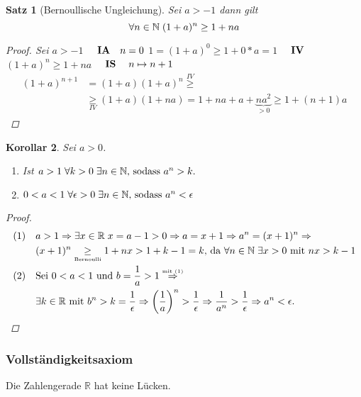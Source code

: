 \documentclass[a4paper,titlepage,oneside]{article}
\def\N{\ensuremath{\mathbb{N}} }
\def\R{\ensuremath{\mathbb{R}} }
\newcommand{\fa}{\ensuremath{\forall}}
\def\sp{\hspace{0,1cm}}
\newcommand{\IA}[1]{\newline\vspace{0.1cm}\ensuremath{\text{\quad\textbf{IA}\quad}#1}\quad}
\newcommand{\IV}{\newline\vspace{0.1cm}\ensuremath{\text{\quad\textbf{IV}\quad}}}
\newcommand{\IS}[1]{\newline\vspace{0.1cm}\ensuremath{\text{\quad\textbf{IS}\quad\sp}#1}}
\theoremstyle{thmstyle}
\newtheorem{satz}{Satz}[subsection]
\newtheorem{korr}[satz]{Korollar}
\begin{document}
\begin{satz}[Bernoullische Ungleichung]
Sei \(a > -1\) dann gilt \[\fa n \in \N \sp (1+a)^n \ge 1 + na \]
\begin{proof}Sei \(a > -1\)
\IA{n=0} \(1 = (1 + a)^0 \ge 1 + 0*a = 1\)
\IV \((1+a)^n \ge 1 + na \)
\IS{n \mapsto n+1}
\begin{align*} (1+a)^{n+1} &= (1+a)(1+a)^n \overset{IV}{\ge}  \\
&\underset{IV}{\ge} (1 + a)(1 + na) = 1 + na + a + \underbrace{na^2}_{> 0} \ge 1 + (n+1)a
\end{align*}
\end{proof}
\end{satz}
\newpage

\begin{korr}
Sei \(a > 0\).
\begin{enumerate}[label=(\arabic*)]
\item Ist \sp \(a > 1 \sp \forall k > 0 \sp \exists n \in \N \text{, sodass }a^n > k.\)
\item \(0 < a < 1 \sp \forall \epsilon > 0 \sp \exists n \in \N \text{, sodass }a^n < \epsilon\)
\end{enumerate}
\begin{proof}
\sp
\begin{align*}
\text{(1)\quad} &a > 1 \Rightarrow \exists x \in \R \sp x = a - 1 > 0 \Rightarrow a = x +1 \Rightarrow a^n = (x + 1)^n \Rightarrow \\
&(x + 1)^n \underset{\text{\tiny{Bernoulli}}}{\ge} 1 + nx  > 1 + k -1 = k \text{, da }\forall n \in \N \sp \exists x > 0 \text{ mit } nx > k - 1\\
\text{(2)\quad} &\text{Sei } 0 < a < 1 \text{ und } b = \frac{1}{a} > 1 \overset{\text{\tiny{mit (1)}}}{\Rightarrow} \\
&\exists k \in \R \text{ mit } b^n > k = \frac{1}{\epsilon} \Rightarrow \left(\frac{1}{a}\right)^n > \frac{1}{\epsilon} \Rightarrow  \frac{1}{a^n} > \frac{1}{\epsilon} \Rightarrow a^n < \epsilon.
\end{align*}
\end{proof}
\end{korr}

\subsubsection{Vollständigkeitsaxiom}
Die Zahlengerade \R hat keine Lücken. 
\end{document}
